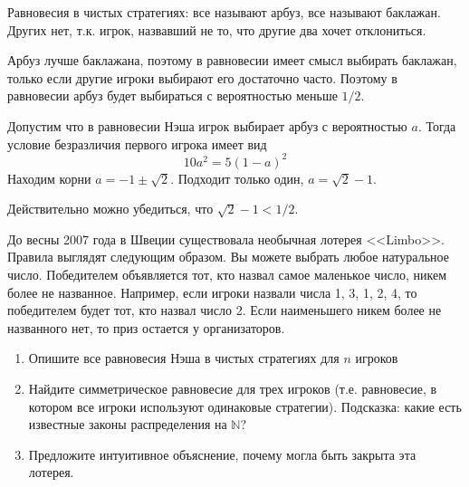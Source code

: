 \begin{solution}
Равновесия в чистых стратегиях: все называют арбуз, все называют баклажан. Других нет, т.к. игрок, назвавший не то, что другие два хочет отклониться.

Арбуз лучше баклажана, поэтому в равновесии имеет смысл выбирать баклажан, только если другие игроки выбирают его достаточно часто. Поэтому в равновесии арбуз будет выбираться  с вероятностью меньше $1/2$.

Допустим что в равновесии Нэша игрок выбирает арбуз с вероятностью $a$. Тогда условие безразличия первого игрока имеет вид
\[
10 a^2 = 5(1-a)^2 
\]
Находим корни $a=-1\pm \sqrt{2}$. Подходит только один, $a=\sqrt{2}-1$.  

Действительно можно убедиться, что $\sqrt{2}-1<1/2$.
\end{solution}



\begin{problem}
До весны 2007 года в Швеции существовала необычная лотерея <<Limbo>>. Правила выглядят следующим образом. Вы можете выбрать любое натуральное число. Победителем объявляется тот, кто назвал самое маленькое число, никем более не названное. Например, если игроки назвали числа 1, 3, 1, 2, 4, то победителем будет тот, кто назвал число 2. Если наименьшего никем более не названного нет, то приз остается у организаторов. 
\begin{enumerate}
\item  Опишите все равновесия Нэша в чистых стратегиях для $n$ игроков 
\item  Найдите симметрическое равновесие для трех игроков (т.е. равновесие, в котором все игроки используют одинаковые стратегии). Подсказка: какие есть известные законы распределения на $\mathbb{N}$? 
\item Предложите интуитивное объяснение, почему могла быть закрыта эта лотерея.

\end{enumerate}
\end{problem}

